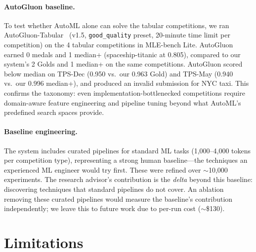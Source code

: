 \documentclass{article}
\begin{document}
\paragraph{AutoGluon baseline.}
To test whether AutoML alone can solve the tabular competitions, we ran AutoGluon-Tabular~\citep{erickson2020autogluon} (v1.5, \texttt{good\_quality} preset, 20-minute time limit per competition) on the 4 tabular competitions in MLE-bench Lite. AutoGluon earned 0 medals and 1 median+ (spaceship-titanic at 0.805), compared to our system's 2 Golds and 1 median+ on the same competitions. AutoGluon scored below median on TPS-Dec (0.950 vs.\ our 0.963 Gold) and TPS-May (0.940 vs.\ our 0.996 median+), and produced an invalid submission for NYC taxi. This confirms the taxonomy: even implementation-bottlenecked competitions require domain-aware feature engineering and pipeline tuning beyond what AutoML's predefined search spaces provide.

\paragraph{Baseline engineering.}
The system includes curated pipelines for standard ML tasks (1,000--4,000 tokens per competition type), representing a strong human baseline---the techniques an experienced ML engineer would try first. These were refined over $\sim$10,000 experiments. The research advisor's contribution is the \emph{delta} beyond this baseline: discovering techniques that standard pipelines do not cover. An ablation removing these curated pipelines would measure the baseline's contribution independently; we leave this to future work due to per-run cost ($\sim$\$130).

\section{Limitations}
\label{sec:limitations}
\end{document}
